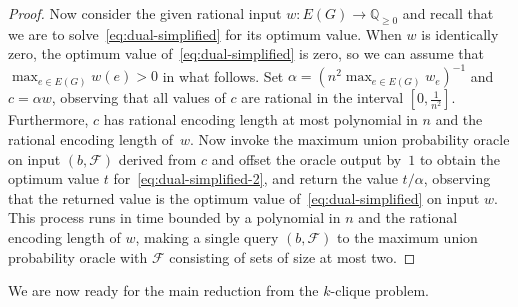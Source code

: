 \documentclass[11pt]{article}
\begin{document}
\begin{proof}
Now consider the given rational input $w:E(G)\rightarrow \mathbb{Q}_{\geq 0}$
and recall that we are to solve~\eqref{eq:dual-simplified} for its
optimum value. 
When $w$ is identically zero, the optimum value of~\eqref{eq:dual-simplified} 
is zero, so we can assume that $\max_{e\in E(G)}w(e)>0$ in what follows. 
Set $\alpha=(n^2\max_{e\in E(G)}w_e)^{-1}$ and $c=\alpha w$, observing that
all values of $c$ are rational in the interval $[0,\frac{1}{n^2}]$. 
Furthermore, $c$ has rational encoding length at most 
polynomial in $n$ and the rational encoding length of~$w$. 
Now invoke the maximum union probability oracle on input $(b,\mathcal{F})$
derived from $c$ and offset the oracle output by~$1$ to obtain the optimum 
value $t$ for~\eqref{eq:dual-simplified-2}, and return the value 
$t/\alpha$, observing that the returned value is the optimum value
of~\eqref{eq:dual-simplified} on input $w$. This process runs in time
bounded by a polynomial in $n$ and the rational encoding length of $w$,
making a single query $(b,\mathcal{F})$ to the maximum union probability 
oracle with $\mathcal{F}$ consisting of sets of size at most two. 
\end{proof}
We are now ready for the main reduction from the $k$-clique problem.
\end{document}
